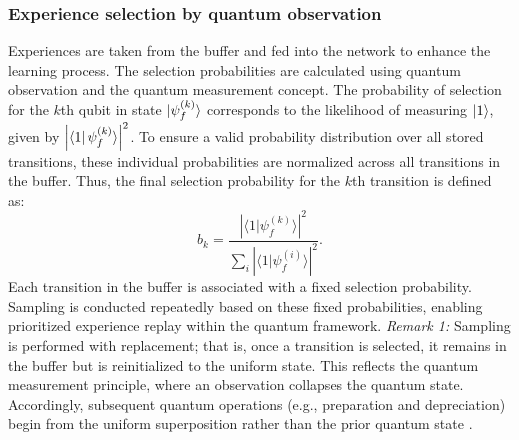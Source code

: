 \documentclass[journal]{IEEEtran}
\begin{document}
\subsubsection{ Experience selection by quantum observation}
Experiences are taken from the buffer and fed into the network to enhance the learning process. The selection probabilities are calculated using quantum observation and the quantum measurement concept. The probability of selection for the $k$th qubit in state $\ket{\psi_f^{(k)}}$ corresponds to the likelihood of measuring $\ket{1}$, given by $\left| \bra{1} \psi_f^{(k)} \rangle \right|^2$. 
To ensure a valid probability distribution over all stored transitions, these individual probabilities are normalized across all transitions in the buffer. Thus, the final selection probability for the $k$th transition is defined as:
\begin{equation}
    b_{k} = \frac{\left| \langle 1 | \psi_f^{(k)} \rangle \right|^2}{\sum_i \left| \langle 1 | \psi_f^{(i)} \rangle \right|^2}.
    \label{replay_prob}
\end{equation}
Each transition in the buffer is associated with a fixed selection probability. Sampling is conducted repeatedly based on these fixed probabilities, enabling prioritized experience replay within the quantum framework.
\textit{Remark 1:} Sampling is performed with replacement; that is, once a transition is selected, it remains in the buffer but is reinitialized to the uniform state. This reflects the quantum measurement principle, where an observation collapses the quantum state. Accordingly, subsequent quantum operations (e.g., preparation and depreciation) begin from the uniform superposition rather than the prior quantum state \cite{9357477}.
\end{document}
